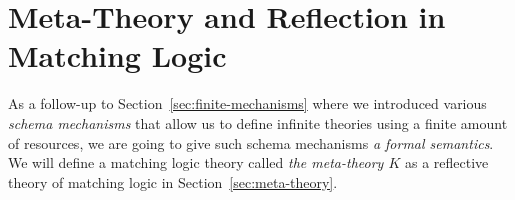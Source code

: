 \documentclass[UTF8,11pt]{article}
\theoremstyle{plain}
\theoremstyle{definition}
\theoremstyle{remark}
\begin{document}
\section{Meta-Theory and Reflection in Matching Logic}
\label{sec:meta-theory-reflection}

As a follow-up to 
Section~\ref{sec:finite-mechanisms} where 
we introduced various \emph{schema mechanisms} that allow us to define infinite 
theories using a finite amount of resources, we are going to give such schema 
mechanisms \emph{a formal semantics}.
We will define a matching logic theory called \emph{the meta-theory $K$} as a 
reflective theory of matching logic in Section~\ref{sec:meta-theory}.

%
%
\end{document}
